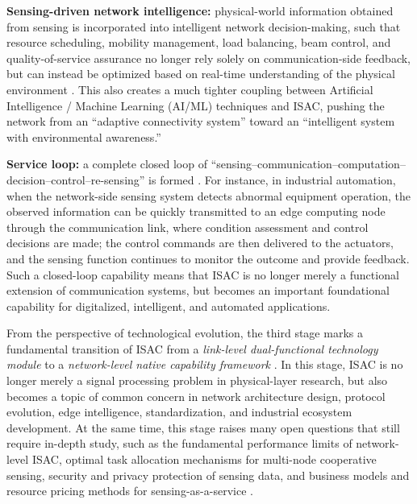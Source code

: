 \begin{itemize}
    \item \textbf{Sensing-driven network intelligence:} physical-world information obtained from sensing is incorporated into intelligent network decision-making, such that resource scheduling, mobility management, load balancing, beam control, and quality-of-service assurance no longer rely solely on communication-side feedback, but can instead be optimized based on real-time understanding of the physical environment \cite{Saad2020Vision6G,Cui2024integrated}. This also creates a much tighter coupling between Artificial Intelligence / Machine Learning (AI/ML) techniques and ISAC, pushing the network from an ``adaptive connectivity system'' toward an ``intelligent system with environmental awareness.''
    \begin{sloppypar}
    \item \textbf{Service loop:} a complete closed loop of ``sensing--communication--computation--decision--control--re-sensing'' is formed \cite{Saad2020Vision6G,Liu2022ISAC}. For instance, in industrial automation, when the network-side sensing system detects abnormal equipment operation, the observed information can be quickly transmitted to an edge computing node through the communication link, where condition assessment and control decisions are made; the control commands are then delivered to the actuators, and the sensing function continues to monitor the outcome and provide feedback. Such a closed-loop capability means that ISAC is no longer merely a functional extension of communication systems, but becomes an important foundational capability for digitalized, intelligent, and automated applications.
    \end{sloppypar}
\end{itemize}

From the perspective of technological evolution, the third stage marks a fundamental transition of ISAC from a \emph{link-level dual-functional technology module} to a \emph{network-level native capability framework} \cite{Liu2022ISAC,Zhang2020perceptive,Cui2024integrated}. In this stage, ISAC is no longer merely a signal processing problem in physical-layer research, but also becomes a topic of common concern in network architecture design, protocol evolution, edge intelligence, standardization, and industrial ecosystem development. At the same time, this stage raises many open questions that still require in-depth study, such as the fundamental performance limits of network-level ISAC, optimal task allocation mechanisms for multi-node cooperative sensing, security and privacy protection of sensing data, and business models and resource pricing methods for sensing-as-a-service \cite{Gonzalez2024integrated,Cui2024integrated}.


